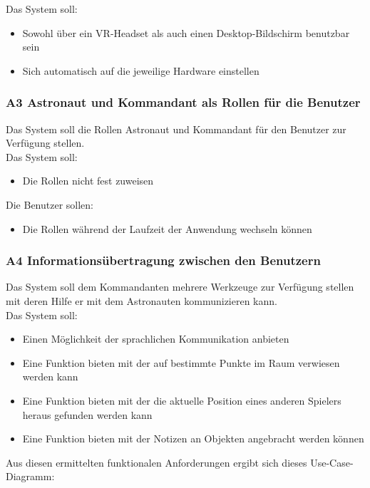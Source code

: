 Das System soll: 
\begin{itemize}
\item Sowohl über ein VR-Headset als auch einen Desktop-Bildschirm benutzbar sein
\item Sich automatisch auf die jeweilige Hardware einstellen
\end{itemize}

\subsubsection*{A3 \label{A3} Astronaut und Kommandant als Rollen für die Benutzer}
Das System soll die Rollen Astronaut und Kommandant für den Benutzer zur Verfügung stellen.\\

Das System soll: 
\begin{itemize}
\item Die Rollen nicht fest zuweisen
\end{itemize}

Die Benutzer sollen:
\begin{itemize}
\item Die Rollen während der Laufzeit der Anwendung wechseln können
\end{itemize}

\subsubsection*{A4 \label{A4} Informationsübertragung zwischen den Benutzern}
Das System soll dem Kommandanten mehrere Werkzeuge zur Verfügung stellen mit deren Hilfe er mit dem Astronauten kommunizieren kann. \\

Das System soll: 
\begin{itemize}
\item Einen Möglichkeit der sprachlichen Kommunikation anbieten
\item Eine Funktion bieten mit der auf bestimmte Punkte im Raum verwiesen werden kann
\item Eine Funktion bieten mit der die aktuelle Position eines anderen Spielers heraus gefunden werden kann
\item Eine Funktion bieten mit der Notizen an Objekten angebracht werden können
\end{itemize}

Aus diesen ermittelten funktionalen Anforderungen ergibt sich dieses Use-Case-Diagramm:

